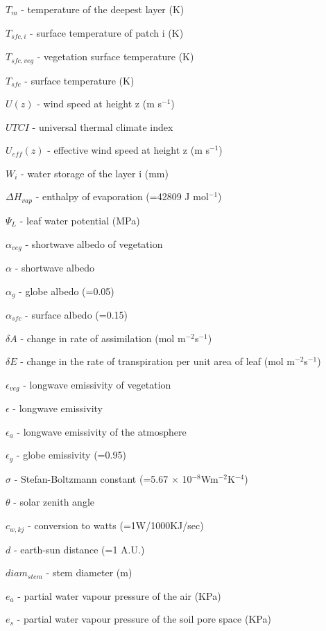 {\begin{description}
\item $T_{m}$  -    temperature of the deepest layer (K) 
\item $T_{sfc,i}$  -  surface temperature of patch i (K) 
\item $T_{sfc,veg}$  -   vegetation surface temperature (K) 
\item $T_{sfc}$  -  surface temperature (K) 
\item $U(z)$  -   wind speed at height z (m s$^{-1}$)  
\item $UTCI$   -    universal thermal climate index
\item $U_{eff}(z)$  -  effective wind speed at height z (m s$^{-1}$) 
\item $W_{i}$  -  water storage of the layer i (mm) 
\item $\Delta H_{vap}$  -  enthalpy of evaporation (=42809 J mol$^{-1}$) 
\item $\Psi_{L}$  -  leaf water potential (MPa) 
\item $\alpha _{veg}$  -     shortwave albedo of vegetation
\item $\alpha$  -  shortwave albedo 
\item $\alpha_{g}$  -  globe albedo (=0.05) 
\item $\alpha_{sfc}$  -  surface albedo (=0.15) 
\item $\delta{A}$  -  change in rate of assimilation (mol m$^{-2}$s$^{-1}$) 
\item $\delta{E}$  -  change in the rate of transpiration per unit area of leaf (mol m$^{-2}$s$^{-1}$)
\item $\epsilon _{veg}$  -   longwave emissivity of vegetation
\item $\epsilon$  -   longwave emissivity
\item $\epsilon_{a}$  -  longwave emissivity of the atmosphere 
\item $\epsilon_{g}$  -  globe emissivity (=0.95)  
\item $\sigma$  -   Stefan-Boltzmann constant (=5.67 $\times$ 10$^{-8}$Wm$^{-2}$K$^{-4}$) 
\item $\theta$  -   solar zenith angle 
\item $c_{w,kj}$  -  conversion to watts (=1W/1000KJ/sec) 
\item $d$  -  earth-sun distance (=1 A.U.) 
\item $diam _{stem}$  -  stem diameter (m) 
\item $e_{a}$  -  partial water vapour pressure of the air (KPa) 
\item $e_{s}$  -  partial water vapour pressure of the soil pore space (KPa) 

\end{description}}

